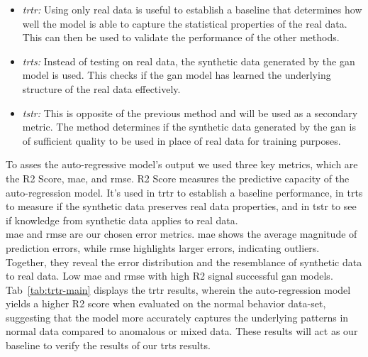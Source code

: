 
\begin{itemize}
    \item \textit{\gls*{trtr}:} Using only real data is useful to establish a baseline that determines how well the model is able to capture the statistical properties of the real data. This can then be used to validate the performance of the other methods.
    \item \textit{\gls*{trts}:} Instead of testing on real data, the synthetic data generated by the 
    \gls*{gan} model is used. This checks if the \gls*{gan} model has learned the underlying structure of the real data effectively.
    \item \textit{\gls*{tstr}:} This is opposite of the previous method and will be used as a secondary metric. The method determines if the synthetic data generated by the \gls*{gan} is of sufficient quality to be used in place of real data for training purposes.
\end{itemize}
To asses the auto-regressive model's output we used three key metrics, which are the R2 Score, \gls*{mae}, and \gls*{rmse}. R2 Score measures the predictive capacity of the auto-regression model. It's used in \gls*{trtr} to establish a baseline performance, in \gls*{trts} to measure if the synthetic data preserves real data properties, and in \gls*{tstr} to see if knowledge from synthetic data applies to real data.
\\
\gls*{mae} and \gls*{rmse} are our chosen error metrics. \gls*{mae}  shows the average magnitude of prediction errors, while \gls*{rmse} highlights larger errors, indicating outliers. Together, they reveal the error distribution and the resemblance of synthetic data to real data. Low \gls*{mae} and \gls*{rmse} with high R2 signal successful \gls*{gan} models.
\\
Tab~\ref{tab:trtr-main} displays the \gls*{trtr} results, wherein the auto-regression model yields a higher R2 score when evaluated on the normal behavior data-set, suggesting that the model more accurately captures the underlying patterns in normal data compared to anomalous or mixed data. These results will act as our baseline to verify the results of our \gls*{trts} results.

